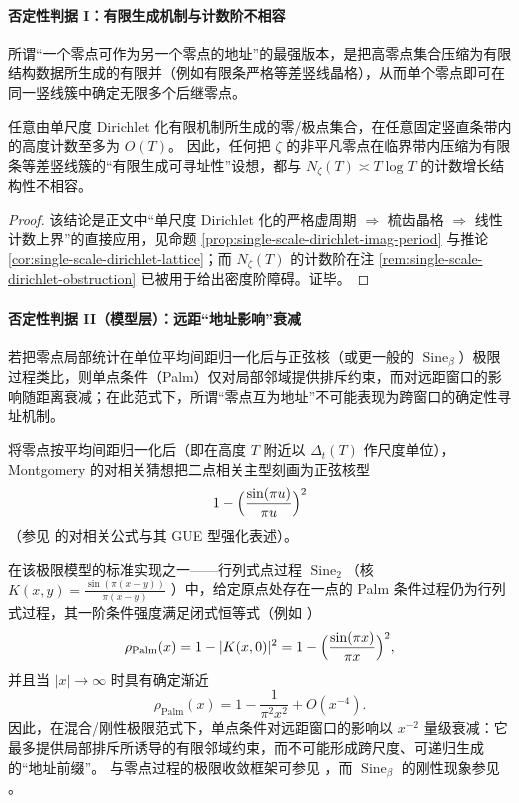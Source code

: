 \paragraph{否定性判据 I：有限生成机制与计数阶不相容}
所谓“一个零点可作为另一个零点的地址”的最强版本，是把高零点集合压缩为有限结构数据所生成的有限并（例如有限条严格等差竖线晶格），从而单个零点即可在同一竖线簇中确定无限多个后继零点。
\begin{proposition}[有限生成可寻址性的计数障碍]\label{prop:xi-addressability-counting-obstruction}
任意由单尺度 Dirichlet 化有限机制所生成的零/极点集合，在任意固定竖直条带内的高度计数至多为 \(O(T)\)。
因此，任何把 \(\zeta\) 的非平凡零点在临界带内压缩为有限条等差竖线簇的“有限生成可寻址性”设想，都与 \(N_\zeta(T)\asymp T\log T\) 的计数增长结构性不相容。
\end{proposition}
\begin{proof}
该结论是正文中“单尺度 Dirichlet 化的严格虚周期 \(\Rightarrow\) 梳齿晶格 \(\Rightarrow\) 线性计数上界”的直接应用，见命题 \ref{prop:single-scale-dirichlet-imag-period} 与推论 \ref{cor:single-scale-dirichlet-lattice}；而 \(N_\zeta(T)\) 的计数阶在注 \ref{rem:single-scale-dirichlet-obstruction} 已被用于给出密度阶障碍。证毕。
\end{proof}

\paragraph{否定性判据 II（模型层）：远距“地址影响”衰减}
若把零点局部统计在单位平均间距归一化后与正弦核（或更一般的 \(\operatorname{Sine}_\beta\)）极限过程类比，则单点条件（Palm）仅对局部邻域提供排斥约束，而对远距窗口的影响随距离衰减；在此范式下，所谓“零点互为地址”不可能表现为跨窗口的确定性寻址机制。
\begin{remark}\label{rem:xi-addressability-palm-decay}
将零点按平均间距归一化后（即在高度 \(T\) 附近以 \(\Delta_t(T)\) 作尺度单位），Montgomery 的对相关猜想把二点相关主型刻画为正弦核型
\[
1-\Bigl(\frac{\sin(\pi u)}{\pi u}\Bigr)^2
\]
（参见 \cite{Montgomery1973PairCorrelation} 的对相关公式与其 GUE 型强化表述）。
\par
在该极限模型的标准实现之一——行列式点过程 \(\operatorname{Sine}_2\)（核
\(
K(x,y)=\frac{\sin(\pi(x-y))}{\pi(x-y)}
\)
）中，给定原点处存在一点的 Palm 条件过程仍为行列式过程，其一阶条件强度满足闭式恒等式（例如 \cite[Chapter~4]{HoughKrishnapurPeresVirag2009GAFDPP}）
\[
\rho_{\mathrm{Palm}}(x)=1-|K(x,0)|^2
=1-\Bigl(\frac{\sin(\pi x)}{\pi x}\Bigr)^2,
\]
并且当 \(|x|\to\infty\) 时具有确定渐近
\[
\rho_{\mathrm{Palm}}(x)=1-\frac{1}{\pi^2x^2}+O(x^{-4}).
\]
因此，在混合/刚性极限范式下，单点条件对远距窗口的影响以 \(x^{-2}\) 量级衰减：它最多提供局部排斥所诱导的有限邻域约束，而不可能形成跨尺度、可递归生成的“地址前缀”。
与零点过程的极限收敛框架可参见 \cite{AriasDeReynaRodgers2024ConvergencePointsZetaZeros}，而 \(\operatorname{Sine}_\beta\) 的刚性现象参见 \cite{ChhaibiNajnudel2018RigiditySineBeta}。
\end{remark}

